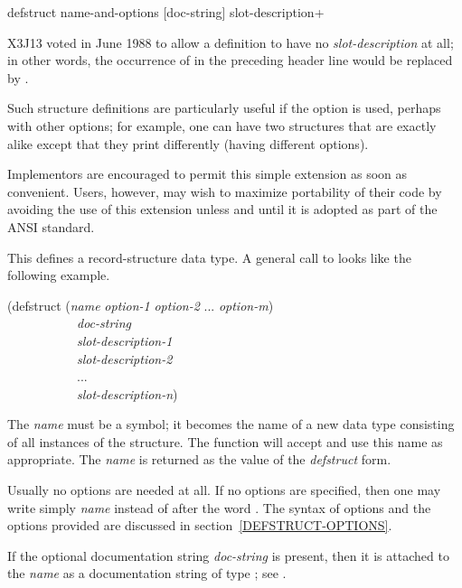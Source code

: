 \begin{defmac}
defstruct name-and-options [doc-string] {slot-description}+

\begin{new}\noindent
X3J13 voted in June 1988
to allow a  definition
to have no {\it slot-description} at all; in other words, the
occurrence of  in the preceding
header line would be replaced by .

Such structure definitions are particularly useful if the
 option is used, perhaps with other options; for example,
one can have two structures that are exactly alike except that they
print differently (having different  options).

Implementors are encouraged to permit this simple extension as soon as
convenient.  Users, however, may wish to maximize portability of their
code by avoiding the use of this extension unless and until it is
adopted as part of the ANSI standard.
\end{new}

This defines a record-structure data type.
A general call to  looks like the following example.
\begin{lisp}
(defstruct ({\it name} {\it option-1} {\it option-2} ... {\it option-m}) \\
~~~~~~~~~~~{\it doc-string} \\
~~~~~~~~~~~{\it slot-description-1} \\
~~~~~~~~~~~{\it slot-description-2} \\
~~~~~~~~~~~... \\
~~~~~~~~~~~{\it slot-description-n}) \\
\end{lisp}
The {\it name} must be a symbol; it becomes the name of a new data type
consisting of all instances of the structure.
The function  will accept and use this name
as appropriate.  The {\it name} is returned as the value of the {\it defstruct}
form.

Usually no options are needed at all.
If no options are specified, then one may write simply {\it name} instead
of  after the word .  The syntax of options
and the options provided are discussed in section~\ref{DEFSTRUCT-OPTIONS}.

If the optional documentation string {\it doc-string} is present,
then it is attached to the {\it name}
as a documentation string of type ; see .


\end{defmac}
